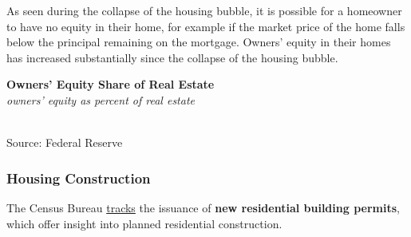 \documentclass{report}
\makeatletter
\newcommand{\tbllink}[1]{\href{https://raw.githubusercontent.com/bdecon/US-chartbook/master/chartbook/data/#1}{\faTable}}
\newcommand*\short[1]{\expandafter\@gobbletwo\number\numexpr#1\relax}
\newcommand{\shdateaxisticks}{
		date coordinates in=x, axis line style={draw=none},
		xmax={2023-10-01},
		max space between ticks=40,	    
		xtick={{1990-01-01}, {1995-01-01}, {2000-01-01}, 
			{2005-01-01}, {2010-01-01}, {2015-01-01}, {2020-01-01}},
		minor xtick={},
		enlarge y limits={0.06}, enlarge x limits={0.01},
		}
\newcommand{\stdline}[4]{\addplot[very thick, no markers, color=#1] 
		table [x=#2, y=#3, col sep=comma] {#4};	}
\newcommand{\rbars}{
		\fill[color=black!10] (axis cs:{1990-07-01},\pgfkeysvalueof{/pgfplots/ymin}) rectangle 
			(axis cs:{1991-03-01}, \pgfkeysvalueof{/pgfplots/ymax});
		\fill[color=black!10] (axis cs:{2007-12-01},\pgfkeysvalueof{/pgfplots/ymin}) rectangle 
			(axis cs:{2009-07-01}, \pgfkeysvalueof{/pgfplots/ymax});
		\fill[color=black!10] (axis cs:{2001-03-01},\pgfkeysvalueof{/pgfplots/ymin}) rectangle 
			(axis cs:{2001-11-01}, \pgfkeysvalueof{/pgfplots/ymax});
		\fill[color=black!10] (axis cs:{2020-02-01},\pgfkeysvalueof{/pgfplots/ymin}) rectangle 
			(axis cs:{2020-05-01}, \pgfkeysvalueof{/pgfplots/ymax});}
\makeatother
\begin{document}
{\begin{minipage}{0.76\textwidth}
As seen during the collapse of the housing bubble, it is possible for a homeowner to have no equity in their home, for example if the market price of the home falls below the principal remaining on the mortgage. Owners' equity in their homes has increased substantially since the collapse of the housing bubble. 
\end{minipage}
\vspace{1mm}

\begin{minipage}{0.31\textwidth}
\small 
\end{minipage}\hspace{7mm}
\begin{minipage}{0.41\textwidth} 
\normalsize \textbf{Owners' Equity Share of Real Estate}\\
\footnotesize{\textit{owners' equity as percent of real estate}}\\
\hspace*{-2mm} \\
\footnotesize{Source: Federal Reserve} \hspace{30mm} \tbllink{homeeq.csv} 

\end{minipage}
\newpage
\begin{minipage}{0.76\textwidth}  
\subsubsection*{Housing Construction} 
\small The Census Bureau \href{https://www.census.gov/construction/bps/}{tracks} the issuance of \textbf{new residential building permits}, which offer insight into planned residential construction. 
\vspace{1mm}


\end{minipage}}
\end{document}
